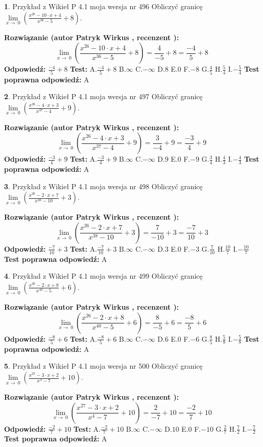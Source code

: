 \documentclass[12pt, a4paper]{article}
\theoremstyle{definition} %
\newtheorem{zad}{}
\newcommand{\zadStart}[1]{\begin{zad}#1\newline}
\newcommand{\zadStop}{\end{zad}}
\newcommand{\rozwStart}[2]{\noindent \textbf{Rozwiązanie (autor #1 , recenzent #2): }\newline}
\newcommand{\rozwStop}{\newline}
\newcommand{\odpStart}{\noindent \textbf{Odpowiedź:}\newline}
\newcommand{\odpStop}{\newline}
\newcommand{\testStart}{\noindent \textbf{Test:}\newline}
\newcommand{\testStop}{\newline}
\newcommand{\kluczStart}{\noindent \textbf{Test poprawna odpowiedź:}\newline}
\newcommand{\kluczStop}{\newline}
\begin{document}
\zadStart{Przykład z Wikieł P 4.1 moja wersja nr 496}
Obliczyć granicę $\lim\limits_{x\to\ 0}(\frac{x^{26}-10 \cdot x +4}{x^{36}-5}+8)$.
\zadStop
\rozwStart{Patryk Wirkus}{}
$$\lim\limits_{x\to\ 0}(\frac{x^{26}-10 \cdot x +4}{x^{36}-5}+8)=\frac{4}{-5}+8=\frac{-4}{5}+8$$
\rozwStop
\odpStart
$\frac{-4}{5}+8$
\odpStop
\testStart
A.$\frac{-4}{5}+8$
B.$\infty$
C.$-\infty$
D.$8$
E.$0$
F.$-8$
G.$\frac{4}{5}$
H.$\frac{5}{4}$
I.$-\frac{5}{4}$
\testStop
\kluczStart
A
\kluczStop



\zadStart{Przykład z Wikieł P 4.1 moja wersja nr 497}
Obliczyć granicę $\lim\limits_{x\to\ 0}(\frac{x^{26}-4 \cdot x +3}{x^{37}-4}+9)$.
\zadStop
\rozwStart{Patryk Wirkus}{}
$$\lim\limits_{x\to\ 0}(\frac{x^{26}-4 \cdot x +3}{x^{37}-4}+9)=\frac{3}{-4}+9=\frac{-3}{4}+9$$
\rozwStop
\odpStart
$\frac{-3}{4}+9$
\odpStop
\testStart
A.$\frac{-3}{4}+9$
B.$\infty$
C.$-\infty$
D.$9$
E.$0$
F.$-9$
G.$\frac{3}{4}$
H.$\frac{4}{3}$
I.$-\frac{4}{3}$
\testStop
\kluczStart
A
\kluczStop



\zadStart{Przykład z Wikieł P 4.1 moja wersja nr 498}
Obliczyć granicę $\lim\limits_{x\to\ 0}(\frac{x^{26}-2 \cdot x +7}{x^{38}-10}+3)$.
\zadStop
\rozwStart{Patryk Wirkus}{}
$$\lim\limits_{x\to\ 0}(\frac{x^{26}-2 \cdot x +7}{x^{38}-10}+3)=\frac{7}{-10}+3=\frac{-7}{10}+3$$
\rozwStop
\odpStart
$\frac{-7}{10}+3$
\odpStop
\testStart
A.$\frac{-7}{10}+3$
B.$\infty$
C.$-\infty$
D.$3$
E.$0$
F.$-3$
G.$\frac{7}{10}$
H.$\frac{10}{7}$
I.$-\frac{10}{7}$
\testStop
\kluczStart
A
\kluczStop



\zadStart{Przykład z Wikieł P 4.1 moja wersja nr 499}
Obliczyć granicę $\lim\limits_{x\to\ 0}(\frac{x^{26}-2 \cdot x +8}{x^{40}-5}+6)$.
\zadStop
\rozwStart{Patryk Wirkus}{}
$$\lim\limits_{x\to\ 0}(\frac{x^{26}-2 \cdot x +8}{x^{40}-5}+6)=\frac{8}{-5}+6=\frac{-8}{5}+6$$
\rozwStop
\odpStart
$\frac{-8}{5}+6$
\odpStop
\testStart
A.$\frac{-8}{5}+6$
B.$\infty$
C.$-\infty$
D.$6$
E.$0$
F.$-6$
G.$\frac{8}{5}$
H.$\frac{5}{8}$
I.$-\frac{5}{8}$
\testStop
\kluczStart
A
\kluczStop



\zadStart{Przykład z Wikieł P 4.1 moja wersja nr 500}
Obliczyć granicę $\lim\limits_{x\to\ 0}(\frac{x^{27}-3 \cdot x +2}{x^{4}-7}+10)$.
\zadStop
\rozwStart{Patryk Wirkus}{}
$$\lim\limits_{x\to\ 0}(\frac{x^{27}-3 \cdot x +2}{x^{4}-7}+10)=\frac{2}{-7}+10=\frac{-2}{7}+10$$
\rozwStop
\odpStart
$\frac{-2}{7}+10$
\odpStop
\testStart
A.$\frac{-2}{7}+10$
B.$\infty$
C.$-\infty$
D.$10$
E.$0$
F.$-10$
G.$\frac{2}{7}$
H.$\frac{7}{2}$
I.$-\frac{7}{2}$
\testStop
\kluczStart
A
\kluczStop
\end{document}
